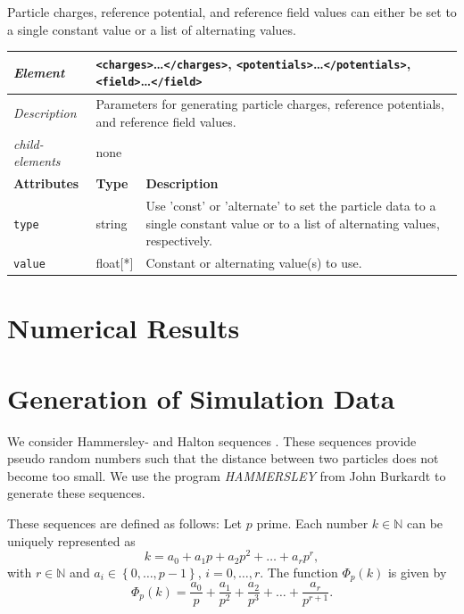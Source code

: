 \noindent
Particle charges, reference potential, and reference field values can either be set to a single constant value or a list of alternating values.

\begin{center}
\small
\begin{tabular}{|p{3cm}|p{1.5cm}|p{8.5cm}|}
  \hline
  \textit{Element}        & \multicolumn{2}{p{10cm}|}{\texttt{<charges>}\dots\texttt{</charges>}, \newline \texttt{<potentials>}\dots\texttt{</potentials>}, \newline \texttt{<field>}\dots\texttt{</field>}} \\ \hline
  \textit{Description}    & \multicolumn{2}{p{10cm}|}{Parameters for generating particle charges, reference potentials, and reference field values.} \\ \hline
  \textit{child-elements} & none \\ \hline
  \hline
  \textbf{Attributes}     & \textbf{Type} & \textbf{Description} \\ \hline
  \texttt{type}           & string        & Use 'const' or 'alternate' to set the particle data to a single constant value or to a list of alternating values, respectively. \\ \hline
  \texttt{value}          & float[*]      & Constant or alternating value(s) to use. \\ \hline
\end{tabular}
\end{center}


\section{Numerical Results}\label{sec:numerik}
%
\section{Generation of Simulation Data}

We consider Hammersley- and Halton sequences \cite{wong97a}.  These
sequences provide pseudo random numbers such that the distance between
two particles does not become too small.  We use the program
\textit{HAMMERSLEY} \cite{hammersley} from John Burkardt to generate
these sequences.

These sequences are defined as follows: Let $p$ prime. Each number
$k\in \mathbb N$ can be uniquely represented as
\[
k = a_0 + a_1 p + a_2 p^2 + \ldots + a_r p^r,
\]
with $r\in\mathbb N$ and $a_i \in \left\{0,\hdots,p-1 \right\}$,
$i=0,\hdots,r$. The function $\Phi_p(k)$ is given by
\[
\Phi_p(k) = \dfrac{a_0}{p} + \dfrac{a_1}{p^2} + \dfrac{a_2}{p^3} +
\ldots + \dfrac{a_r}{p^{r+1}}.
\]


